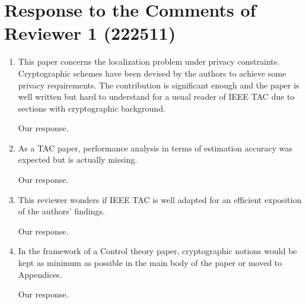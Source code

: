 \documentclass[a4paper]{scrartcl}
\newenvironment{rebuttal}{\begin{enumerate}[label={\color{grey}\thesection.\arabic{enumi}},leftmargin=0pt,ref=\thesection.\arabic{enumi}]}{\end{enumerate}}
\newcommand{\reviewtext}[1]{{\color{nblue} #1}}
\begin{document}
\section*{Response to the Comments of Reviewer 1 (222511)}
\def\thesection{R1}
\begin{rebuttal}
\item \reviewtext{This paper concerns the localization problem under privacy constraints. Cryptographic schemes have been devised by the authors to achieve some privacy requirements. The contribution is significant enough and the paper is well written but hard to understand for a usual reader of IEEE TAC due to sections with cryptographic background.}

Our response.

\item \reviewtext{As a TAC paper, performance analysis in terms of estimation accuracy was expected but is actually missing.}

Our response.

\item \reviewtext{This reviewer wonders if IEEE TAC is well adapted for an efficient exposition of the authors' findings.}

Our response.

\item \reviewtext{In the framework of a Control theory paper, cryptographic notions would be kept as minimum as possible in the main body of the paper or moved to Appendices.}

Our response.

\end{rebuttal}

\end{document}
